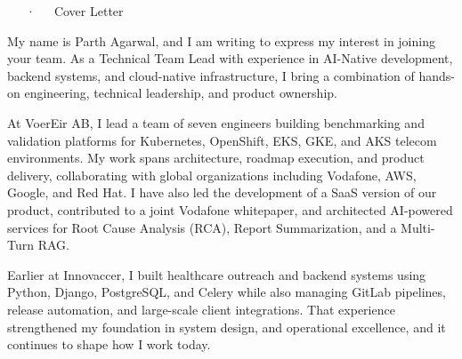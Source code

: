 \documentclass[11pt, a4paper]{src/awesome-cv}
\begin{document}
\makecvheader[C]

\makecvfooter
  {}
  {\nameInfo~~~·~~~Cover Letter}
  {}

\makelettertitle

\begin{cvletter}


\begin{cvparagraph}
\vspace{1em}
My name is Parth Agarwal, and I am writing to express my interest in joining your team. As a Technical Team Lead with experience in AI-Native development, backend systems, and cloud-native infrastructure, I bring a combination of hands-on engineering, technical leadership, and product ownership.
\end{cvparagraph}



\begin{cvparagraph}
\vspace{1em}
At VoerEir AB, I lead a team of seven engineers building benchmarking and validation platforms for Kubernetes, OpenShift, EKS, GKE, and AKS telecom environments. My work spans architecture, roadmap execution, and product delivery, collaborating with global organizations including Vodafone, AWS, Google, and Red Hat. I have also led the development of a SaaS version of our product, contributed to a joint Vodafone whitepaper, and architected AI-powered services for Root Cause Analysis (RCA), Report Summarization, and a Multi-Turn RAG.

Earlier at Innovaccer, I built healthcare outreach and backend systems using Python, Django, PostgreSQL, and Celery while also managing GitLab pipelines, release automation, and large-scale client integrations. That experience strengthened my foundation in system design, and operational excellence, and it continues to shape how I work today.
\end{cvparagraph}


\end{cvletter}
\end{document}
